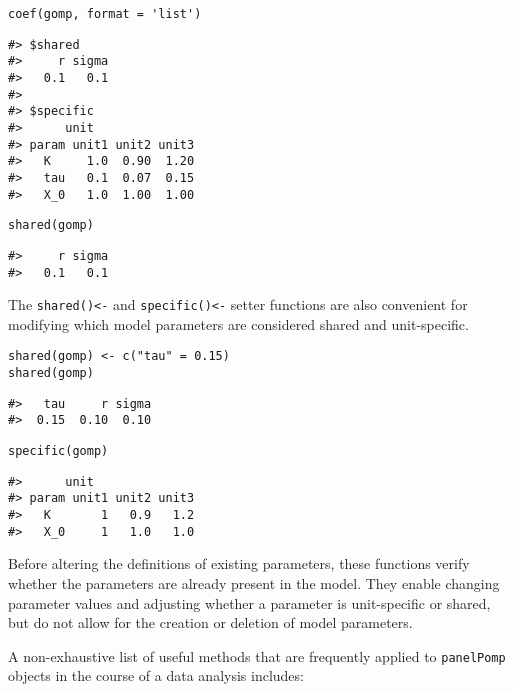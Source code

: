 \begin{verbatim}
coef(gomp, format = 'list')
\end{verbatim}

\begin{verbatim}
#> $shared
#>     r sigma 
#>   0.1   0.1 
#> 
#> $specific
#>      unit
#> param unit1 unit2 unit3
#>   K     1.0  0.90  1.20
#>   tau   0.1  0.07  0.15
#>   X_0   1.0  1.00  1.00
\end{verbatim}

\begin{verbatim}
shared(gomp)
\end{verbatim}

\begin{verbatim}
#>     r sigma 
#>   0.1   0.1
\end{verbatim}

The \texttt{shared()\textless{}-} and \texttt{specific()\textless{}-} setter functions are also convenient for modifying which model parameters are considered shared and unit-specific.

\begin{verbatim}
shared(gomp) <- c("tau" = 0.15)
shared(gomp)
\end{verbatim}

\begin{verbatim}
#>   tau     r sigma 
#>  0.15  0.10  0.10
\end{verbatim}

\begin{verbatim}
specific(gomp)
\end{verbatim}

\begin{verbatim}
#>      unit
#> param unit1 unit2 unit3
#>   K       1   0.9   1.2
#>   X_0     1   1.0   1.0
\end{verbatim}

Before altering the definitions of existing parameters, these functions verify whether the parameters are already present in the model.
They enable changing parameter values and adjusting whether a parameter is unit-specific or shared, but do not allow for the creation or deletion of model parameters.

A non-exhaustive list of useful methods that are frequently applied to \texttt{panelPomp} objects in the course of a data analysis includes:

